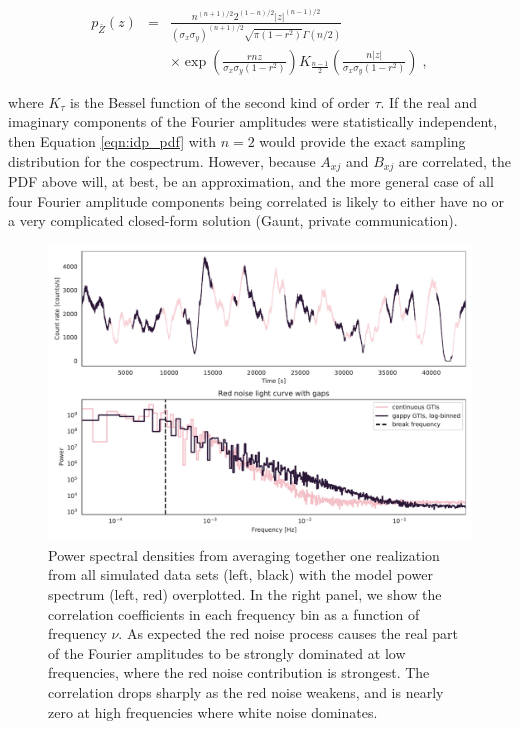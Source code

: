 \documentclass[fleqn,usenatbib]{mnras}
\begin{document}
\begin{eqnarray}
\label{eqn:idp_pdf}
p_{\bar{Z}}(z) & = & \frac{n^{(n+1)/2} 2^{(1-n)/2} |z|^{(n-1)/2}}{(\sigma_x \sigma_y)^{(n+1)/2} \sqrt{\pi (1 - r^2)} \Gamma(n/2)} \\ \nonumber
       & & \times \exp{\left( \frac{r n z}{\sigma_x \sigma_y (1-r^2)} \right)} K_{\frac{n-1}{2}}\left( \frac{n |z|}{\sigma_x \sigma_y (1 - r^2)}  \right) \; ,
\end{eqnarray}

\noindent where $K_\tau$ is the Bessel function of the second kind of order $\tau$. If the real and imaginary components of the Fourier amplitudes were statistically independent, then Equation \ref{eqn:idp_pdf} with $n=2$ would provide the exact sampling distribution for the cospectrum. However, because $A_{xj}$ and $B_{xj}$ are correlated, the PDF above will, at best, be an approximation, and the more general case of all four Fourier amplitude components being correlated is likely to either have no or a very complicated closed-form solution (Gaunt, private communication).


\begin{figure}
\begin{center}
\includegraphics[width=\textwidth]{../figs/rednoise_psd.pdf}
\caption{Power spectral densities from averaging together one realization from all simulated data sets (left, black) with the model power spectrum (left, red) overplotted. In the right panel, we show the correlation coefficients in each frequency bin as a function of frequency $\nu$. As expected the red noise process causes the real part of the Fourier amplitudes to be strongly dominated at low frequencies, where the red noise contribution is strongest. The correlation drops sharply as the red noise weakens, and is nearly zero at high frequencies where white noise dominates.}
\label{fig:rednoise_psd}
\end{center}
\end{figure}
\end{document}
